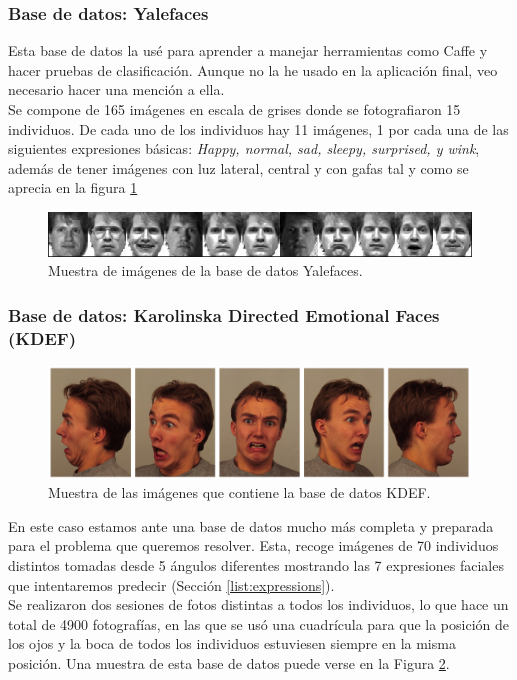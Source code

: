 \documentclass[a4paper,11pt]{book}
\begin{document}
\subsubsection{Base de datos: Yalefaces \cite{yalefaces}}
Esta base de datos la usé para aprender a manejar herramientas como Caffe y hacer pruebas de clasificación. Aunque no la he usado en la aplicación final, veo necesario hacer una mención a ella.\\
Se compone de 165 imágenes en escala de grises donde se fotografiaron 15 individuos. De cada uno de los individuos hay 11 imágenes, 1 por cada una de las siguientes expresiones básicas:
\textit{Happy, normal, sad, sleepy, surprised, y wink}, además de tener imágenes con luz lateral, central y con gafas tal y como se aprecia en la figura \ref{fig:yalefaceSample}
\begin{figure}[h]
\centering
\includegraphics[width=1.0\linewidth]{imagenes/yalefaceSample}
\caption[yafaces]{Muestra de imágenes de la base de datos Yalefaces.}
\label{fig:yalefaceSample}
\end{figure}


\subsubsection{Base de datos: Karolinska Directed Emotional Faces (KDEF) \cite{kdef98}}\label{db:kdef}
\begin{figure}[h]
	\centering
	\includegraphics[width=1.0\linewidth]{imagenes/kdefSample}
	\caption[Muestra de KDEF]{Muestra de las imágenes que contiene la base de datos KDEF.}
	\label{fig:kdefSample}
\end{figure}
En este caso estamos ante una base de datos mucho más completa y preparada para el problema que queremos resolver. Esta, recoge imágenes de 70 individuos distintos tomadas desde 5 ángulos diferentes mostrando las 7 expresiones faciales que intentaremos predecir (Sección \ref{list:expressions}).\\
Se realizaron dos sesiones de fotos distintas a todos los individuos, lo que hace un total de 4900 fotografías, en las que se usó una cuadrícula para que la posición de los ojos y la boca de todos los individuos estuviesen siempre en la misma posición. Una muestra de esta base de datos puede verse en la Figura \ref{fig:kdefSample}.
\end{document}
